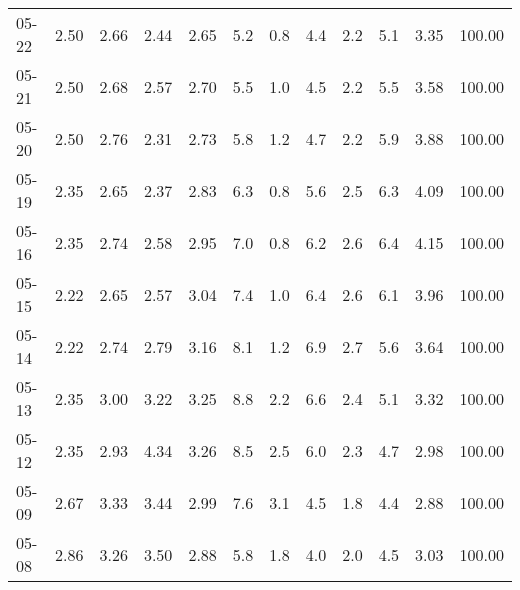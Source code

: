 \begin{threeparttable}
{\begin{tabular}{lrrrrrrrrrrr}
  05-22 &          2.50 &          2.66 &          2.44 &        2.65 &                 5.2 &                 0.8 &        4.4 &                 2.2 &              5.1 &            3.35 &                 100.00 \\
  05-21 &          2.50 &          2.68 &          2.57 &        2.70 &                 5.5 &                 1.0 &        4.5 &                 2.2 &              5.5 &            3.58 &                 100.00 \\
  05-20 &          2.50 &          2.76 &          2.31 &        2.73 &                 5.8 &                 1.2 &        4.7 &                 2.2 &              5.9 &            3.88 &                 100.00 \\
  05-19 &          2.35 &          2.65 &          2.37 &        2.83 &                 6.3 &                 0.8 &        5.6 &                 2.5 &              6.3 &            4.09 &                 100.00 \\
  05-16 &          2.35 &          2.74 &          2.58 &        2.95 &                 7.0 &                 0.8 &        6.2 &                 2.6 &              6.4 &            4.15 &                 100.00 \\
  05-15 &          2.22 &          2.65 &          2.57 &        3.04 &                 7.4 &                 1.0 &        6.4 &                 2.6 &              6.1 &            3.96 &                 100.00 \\
  05-14 &          2.22 &          2.74 &          2.79 &        3.16 &                 8.1 &                 1.2 &        6.9 &                 2.7 &              5.6 &            3.64 &                 100.00 \\
  05-13 &          2.35 &          3.00 &          3.22 &        3.25 &                 8.8 &                 2.2 &        6.6 &                 2.4 &              5.1 &            3.32 &                 100.00 \\
  05-12 &          2.35 &          2.93 &          4.34 &        3.26 &                 8.5 &                 2.5 &        6.0 &                 2.3 &              4.7 &            2.98 &                 100.00 \\
  05-09 &          2.67 &          3.33 &          3.44 &        2.99 &                 7.6 &                 3.1 &        4.5 &                 1.8 &              4.4 &            2.88 &                 100.00 \\
  05-08 &          2.86 &          3.26 &          3.50 &        2.88 &                 5.8 &                 1.8 &        4.0 &                 2.0 &              4.5 &            3.03 &                 100.00 \\

\end{tabular}}
\end{threeparttable}
